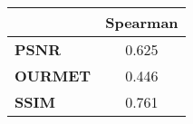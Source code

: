 \begin{tabular}{|l|c|}
\hline
&\textbf{Spearman}\\\hline
\textbf{PSNR}&0.625\\\hline
\textbf{OURMET}&0.446\\\hline
\textbf{SSIM}&0.761\\\hline
\end{tabular}
